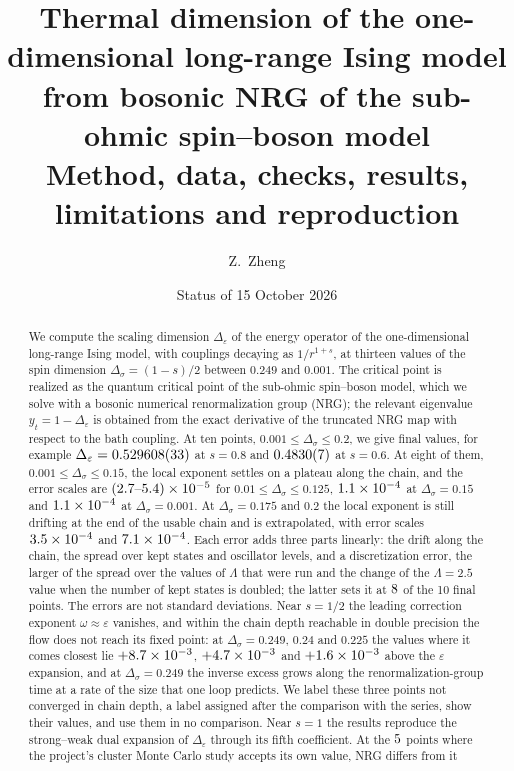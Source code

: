\documentclass[10pt,a4paper]{article}
\title{Thermal dimension of the one-dimensional long-range Ising model\\ from bosonic NRG of the sub-ohmic spin--boson model\\[4pt]
\large Method, data, checks, results, limitations and reproduction}
\author{Z.~Zheng}  %
\date{Status of 15 October 2026}
\newcommand{\Ds}{\Delta_\sigma}
\newcommand{\De}{\Delta_\varepsilon}
\begin{document}
\maketitle

\begin{abstract}\noindent
We compute the scaling dimension $\De$ of the energy operator of the one-dimensional long-range Ising model, with couplings
decaying as $1/r^{1+s}$, at thirteen values of the spin dimension $\Ds=(1-s)/2$ between $0.249$ and $0.001$. The critical point is
realized as the quantum critical point of the sub-ohmic spin--boson model, which we solve with a bosonic numerical renormalization
group (NRG); the relevant eigenvalue $y_t=1-\De$ is obtained from the exact derivative of the truncated NRG map with respect to the
bath coupling. At ten points, $0.001\le\Ds\le0.2$, we give final values, for example $\De=\nrgDEOneHundred$ at $s=0.8$ and
$0.4830(7)$ at $s=0.6$. At eight of them, $0.001\le\Ds\le0.15$, the local exponent settles on a plateau along the chain, and
the error scales are $(2.7\text{--}5.4)\times10^{-5}$ for $0.01\le\Ds\le0.125$, $1.1\times10^{-4}$ at $\Ds=0.15$ and $1.1\times10^{-4}$ at $\Ds=0.001$. At
$\Ds=0.175$ and $0.2$ the local exponent is still drifting at the end of the usable chain and is extrapolated, with error scales
$3.5\times10^{-4}$ and $7.1\times10^{-4}$. Each error adds three parts linearly: the drift along the chain, the spread over kept
states and oscillator levels, and a discretization error, the larger of the spread over the values of $\Lambda$ that were run and the
change of the $\Lambda=2.5$ value when the number of kept states is doubled; the latter sets it at $8$ of the 10 final
points. The errors are not standard deviations. Near $s=1/2$ the leading correction exponent $\omega\approx\varepsilon$ vanishes, and
within the chain depth reachable in double precision the flow does not reach its fixed point: at $\Ds=0.249$, $0.24$ and $0.225$ the
values where it comes closest lie $+8.7\times10^{-3}$, $+4.7\times10^{-3}$ and $+1.6\times10^{-3}$ above the $\varepsilon$
expansion, and at $\Ds=0.249$ the inverse excess grows along the renormalization-group time at a rate of the size that one loop
predicts. We label these three points not converged in chain depth, a label assigned after the comparison with the series, show
their values, and use them in no comparison. Near $s=1$ the results reproduce the strong--weak dual expansion of $\De$ through its
fifth coefficient. At the $5$ points where the project's cluster Monte Carlo study accepts its own value, NRG differs from it

\end{abstract}
\end{document}
